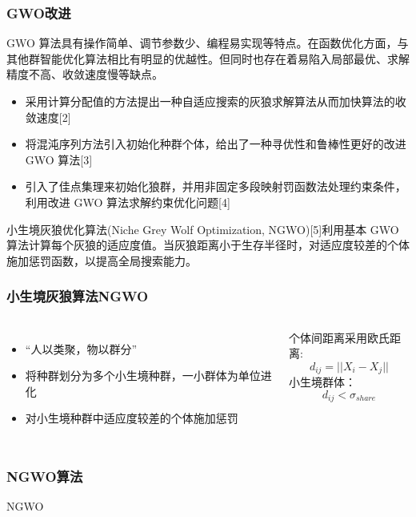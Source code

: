 \begin{frame}
	\frametitle{GWO改进}
	GWO 算法具有操作简单、调节参数少、编程易实现等特点。在函数优化方面，与其他群智能优化算法相比有明显的优越性。但同时也存在着易陷入局部最优、求解精度不高、收敛速度慢等缺点。
	\begin{itemize}
		\item {采用计算分配值的方法提出一种自适应搜索的灰狼求解算法从而加快算法的收敛速度[2]}
		\item {将混沌序列方法引入初始化种群个体，给出了一种寻优性和鲁棒性更好的改进 GWO 算法[3]}
		\item {引入了佳点集理来初始化狼群，并用非固定多段映射罚函数法处理约束条件，利用改进 GWO 算法求解约束优化问题[4]}
	\end{itemize}
	小生境灰狼优化算法(Niche Grey Wolf Optimization, NGWO)[5]利用基本 GWO 算法计算每个灰狼的适应度值。当灰狼距离小于生存半径时，对适应度较差的个体施加惩罚函数，以提高全局搜索能力。
\end{frame}


\begin{frame}
	\frametitle{小生境灰狼算法NGWO}
	\begin{columns}
	\begin{itemize}
		\item {“人以类聚，物以群分”}
		\item {将种群划分为多个小生境种群，一小群体为单位进化}
		\item {对小生境种群中适应度较差的个体施加惩罚}
	\end{itemize}
	个体间距离采用欧氏距离:
	$$d_{ij}=||X_i-X_j||$$
	小生境群体：
	$$d_{ij} < \sigma_{share}$$
	\end{columns}	
\end{frame}


\begin{frame}
	\frametitle{NGWO算法}
	\begin{algorithm}[H]
	\caption{NGWO}\label{nwolf_alg}
	 \scriptsize
		\begin{algorithmic}
				\ENDFOR
				\ENDIF
			\ENDWHILE
		\end{algorithmic}
	\end{algorithm}
\end{frame}


